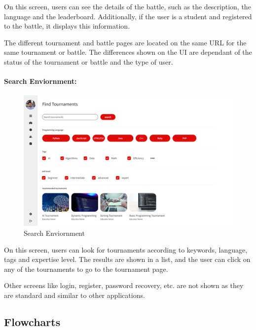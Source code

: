 \documentclass{article}
\begin{document}
On this screen, users can see the details of the battle, such as the description, the
language and the leaderboard. Additionally, if the user is a student and registered to the battle,
it displays this information.

The different tournament and battle pages are located on the same URL for the same tournament or battle.
The differences shown on the UI are dependant of the status of the tournament or battle and the type of user.

\paragraph{Search Enviornment:}

\begin{figure}[H]
    \centering
    \includegraphics[width=1\textwidth]{images/UI/Search.png}
    \caption{Search Enviornment}
    \label{fig:SearchEnviornment}
\end{figure}

On this screen, users can look for tournaments according to keywords, language, tags and expertise level.
The results are shown in a list, and the user can click on any of the tournaments to go to the tournament page.

Other screens like login, register, password recovery, etc. are not shown as they are standard and similar to other applications.

\subsection{Flowcharts}
\end{document}
